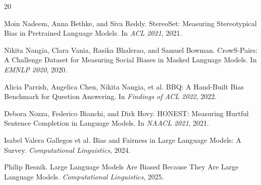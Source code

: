 \documentclass[sigconf,screen]{acmart}
\begin{document}
\begin{thebibliography}{20}

Moin Nadeem, Anna Bethke, and Siva Reddy.
\newblock StereoSet: Measuring Stereotypical Bias in Pretrained Language Models.
\newblock In \emph{ACL 2021}, 2021.

Nikita Nangia, Clara Vania, Rasika Bhalerao, and Samuel Bowman.
\newblock CrowS-Pairs: A Challenge Dataset for Measuring Social Biases in Masked Language Models.
\newblock In \emph{EMNLP 2020}, 2020.

Alicia Parrish, Angelica Chen, Nikita Nangia, et al.
\newblock BBQ: A Hand-Built Bias Benchmark for Question Answering.
\newblock In \emph{Findings of ACL 2022}, 2022.

Debora Nozza, Federico Bianchi, and Dirk Hovy.
\newblock HONEST: Measuring Hurtful Sentence Completion in Language Models.
\newblock In \emph{NAACL 2021}, 2021.


Isabel Valera Gallegos et al.
\newblock Bias and Fairness in Large Language Models: A Survey.
\newblock \emph{Computational Linguistics}, 2024.

Philip Resnik.
\newblock Large Language Models Are Biased Because They Are Large Language Models.
\newblock \emph{Computational Linguistics}, 2025.

\end{thebibliography}
\end{document}
